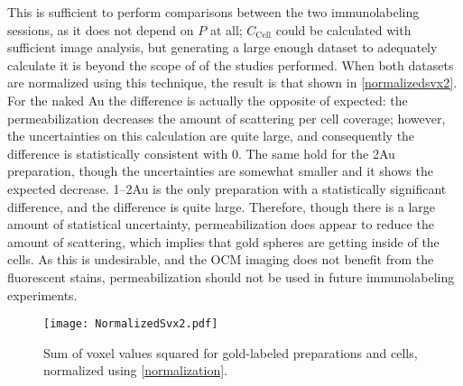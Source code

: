 This is sufficient to perform comparisons between the two immunolabeling sessions, as it does not depend on $P$ at all; $C_{\mathrm{Cell}}$ could be calculated with sufficient image analysis, but generating a large enough dataset to adequately calculate it is beyond the scope of of the studies performed. When both datasets are normalized using this technique, the result is that shown in \autoref{normalizedsvx2}. For the naked Au the difference is actually the opposite of expected: the permeabilization decreases the amount of scattering per cell coverage; however, the uncertainties on this calculation are quite large, and consequently the difference is statistically consistent with 0. The same hold for the 2Au preparation, though the uncertainties are somewhat smaller and it shows the expected decrease. 1--2Au is the only preparation with a statistically significant difference, and the difference is quite large. Therefore, though there is a large amount of statistical uncertainty, permeabilization does appear to reduce the amount of scattering, which implies that gold spheres are getting inside of the cells. As this is undesirable, and the OCM imaging does not benefit from the fluorescent stains, permeabilization should not be used in future immunolabeling experiments.

\begin{figure}[htbp]
\centering
\texttt{[image: NormalizedSvx2.pdf]}
\caption{Sum of voxel values squared for gold-labeled preparations and cells, normalized using \autoref{normalization}.}
\label{normalizedsvx2}
\end{figure}

